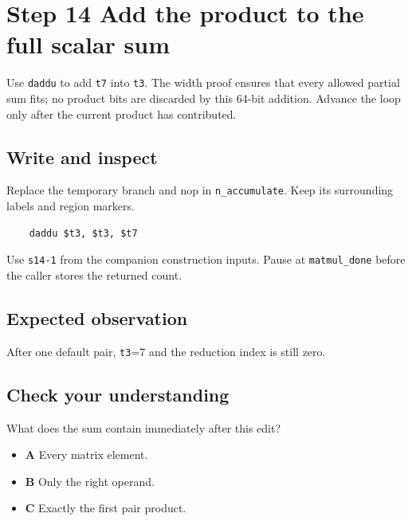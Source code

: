 \section{Step 14 Add the product to the full scalar sum}\label{matmul-s14}

Use \texttt{daddu} to add \texttt{t7} into \texttt{t3}. The width proof ensures that every allowed partial sum fits; no product bits are discarded by this 64-bit addition. Advance the loop only after the current product has contributed.

\subsection{Write and inspect}
Replace the temporary branch and nop in \texttt{n\_accumulate}. Keep its surrounding labels and region markers.

\begin{verbatim}
    daddu $t3, $t3, $t7
\end{verbatim}
Use \texttt{s14-1} from the companion construction inputs. Pause at \texttt{matmul\_done} before the caller stores the returned count.

\subsection{Expected observation}
After one default pair, \texttt{t3}=7 and the reduction index is still zero.

\subsection{Check your understanding}
What does the sum contain immediately after this edit?

\begin{itemize}
  \item \textbf{A} Every matrix element.
  \item \textbf{B} Only the right operand.
  \item \textbf{C} Exactly the first pair product.
\end{itemize}
